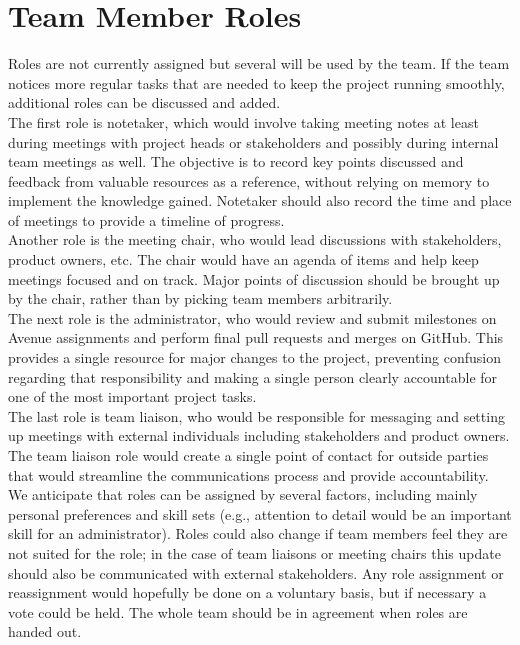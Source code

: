 \documentclass{article}
\begin{document}
\section{Team Member Roles}
Roles are not currently assigned but several will be used by the team. If the team notices more regular tasks that are needed to keep the project running smoothly, additional roles can be discussed and added. \\
The first role is notetaker, which would involve taking meeting notes at least during meetings with project heads or stakeholders and possibly during internal team meetings as well. The objective is to record key points discussed and feedback from valuable resources as a reference, without relying on memory to implement the knowledge gained. Notetaker should also record the time and place of meetings to provide a timeline of progress.\\
Another role is the meeting chair, who would lead discussions with stakeholders, product owners, etc. The chair would have an agenda of items and help keep meetings focused and on track. Major points of discussion should be brought up by the chair, rather than by picking team members arbitrarily.\\
The next role is the administrator, who would review and submit milestones on Avenue assignments and perform final pull requests and merges on GitHub. This provides a single resource for major changes to the project, preventing confusion regarding that responsibility and making a single person clearly accountable for one of the most important project tasks.\\
The last role is team liaison, who would be responsible for messaging and setting up meetings with external individuals including stakeholders and product owners. The team liaison role would create a single point of contact for outside parties that would streamline the communications process and provide accountability.\\
We anticipate that roles can be assigned by several factors, including mainly personal preferences and skill sets (e.g., attention to detail would be an important skill for an administrator). Roles could also change if team members feel they are not suited for the role; in the case of team liaisons or meeting chairs this update should also be communicated with external stakeholders. Any role assignment or reassignment would hopefully be done on a voluntary basis, but if necessary a vote could be held. The whole team should be in agreement when roles are handed out.
\end{document}
